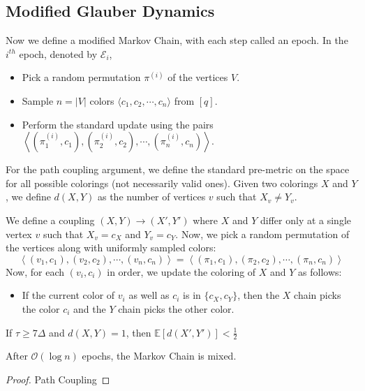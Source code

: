\subsection{Modified Glauber Dynamics}%
\label{sub:modified_glauber_dynamics}

Now we define a modified Markov Chain, with each step called an epoch.
In the $i^{th}$ epoch, denoted by $\mathcal E_i$,
\begin{itemize}
    \item Pick a random permutation $\pi^{(i)}$ of the vertices $V$.
    \item Sample $n = |V|$ colors $ \langle c_1, c_2,\cdots, c_n \rangle$ from $[q]$.
    \item Perform the standard update using the pairs
          $\left\langle (\pi^{(i)}_1, c_1), (\pi^{(i)}_2, c_2), \cdots, (\pi^{(i)}_n, c_n)\right\rangle$.
\end{itemize}

For the path coupling argument, we define the standard pre-metric on the space for all possible colorings (not necessarily valid ones).
Given two colorings $X$ and $Y$, we define $d(X,Y)$ as the number of vertices $v$ such that $X_v\not= Y_v$.

We define a coupling $(X,Y)\rightarrow(X',Y')$ where $X$ and $Y$ differ only at a single vertex $v$ such that $X_v = c_X$ and $Y_v = c_Y$.
Now, we pick a random permutation of the vertices along with uniformly sampled colors:
\[
\left\langle (v_1, c_1), (v_2, c_2), \cdots, (v_n, c_n)\right\rangle
= \left\langle (\pi_1, c_1), (\pi_2, c_2), \cdots, (\pi_n, c_n)\right\rangle
\]
Now, for each $(v_i, c_i)$ in order, we update the coloring of $X$ and $Y$ as follows:
\begin{itemize}
    \item If the current color of $v_i$ as well as $c_i$ is in $\{c_X,c_Y\}$,
    then the $X$ chain picks the color $c_i$ and the $Y$ chain picks the other color.
\end{itemize}

\begin{lemma}
\label{lem:single_epoch_distance}
If $\tau \ge 7\Delta$ and $d(X, Y) = 1$, then $\mathbb E[d(X',Y')] < \frac 12$
\end{lemma}

\begin{theorem}
\label{thm:modified_mixing}
After $\mathcal O(\log n)$ epochs, the Markov Chain is mixed.
\end{theorem}
\begin{proof}
Path Coupling
\end{proof}

